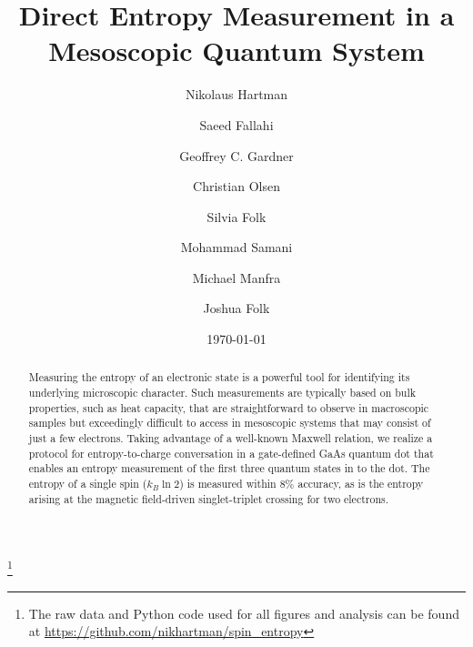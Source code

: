 \documentclass[twocolumn,showpacs,preprintnumbers,amsmath,amssymb,pra,aps,superscriptaddress]{revtex4-1}
\begin{document}
\title{Direct Entropy Measurement in a Mesoscopic Quantum System}
\author{Nikolaus Hartman}
\thanks{The raw data and Python code used for all figures and analysis can be found at \url{https://github.com/nikhartman/spin_entropy}}
\author{Saeed Fallahi}
\author{Geoffrey C. Gardner}
\author{Christian Olsen}
\author{Silvia Folk}
\author{Mohammad Samani}
\author{Michael Manfra}
\author{Joshua Folk}
\date{\today}

\begin{abstract}

Measuring the entropy of an electronic state is a powerful tool for identifying its underlying microscopic character.  Such measurements are typically based on bulk properties, such as heat capacity, that are straightforward to observe in macroscopic samples but exceedingly difficult to access in mesoscopic systems that may consist of just a few electrons. Taking advantage of a well-known Maxwell relation, we realize a protocol for entropy-to-charge conversation in a gate-defined GaAs quantum dot that enables an entropy measurement of the first three quantum states in to the dot. The entropy of a single spin ($k_B \ln{2}$) is measured within 8\% accuracy, as is the entropy arising at the magnetic field-driven singlet-triplet crossing for two electrons.

\end{abstract}

\maketitle
\end{document}
